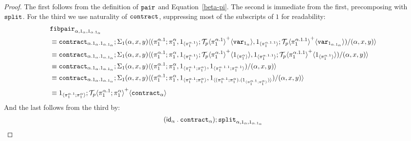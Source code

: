 \documentclass[10pt]{article}
\theoremstyle{definition}
\newcommand{\id}{\mathsf{id}}
\newcommand\ApEl[2]{\mathcal{T}_{#1}\langle#2\rangle}
\newcommand\bdot[0]{\mathbin{.}}
\newcommand\ap[2]{\ensuremath{#1 \langle #2 \rangle }}
\newcommand\ApPlus[2]{\ensuremath{{#1}^+ \langle #2 \rangle }}
\begin{document}
\begin{proof}
The first follows from the definition of $\mathtt{pair}_{}$ and Equation~\ref{beta-pi}. The second is immediate from the first, precomposing with $\mathtt{split}_{}$. For the third we use naturality of $\mathtt{contract}_{}$, suppressing most of the subscripts of $1$ for readability:
\begin{align*}
&\fibpair{\alpha,1_\alpha,1_{\alpha.1_\alpha}} \\
&\equiv \contract{\alpha.1_\alpha.1_{\alpha.1_\alpha}};\ap{\Sigma_1(\alpha,x,y)}{(\pi^{\alpha.1}_1;\pi^{\alpha}_1,\ApOne{\pi^{\alpha.1}_1};\ApPlus{\ApEl{p}{\pi^{\alpha.1}_1}}{\var{1_\alpha}}, \ApOne{\pi^{\alpha.1.1}_1};\ApPlus{\ApEl{p}{\pi^{\alpha.1.1}_1}}{\var{1_{\alpha.1_\alpha}}})/(\alpha,x,y)} \\
&\equiv \contract{\alpha.1_\alpha.1_{\alpha.1_\alpha}};\ap{\Sigma_1(\alpha,x,y)}{(\pi^{\alpha.1}_1;\pi^{\alpha}_1,\ApOne{\pi^{\alpha.1}_1};\ApPlus{\ApEl{p}{\pi^{\alpha.1}_1}}{\ApOne{\pi^\alpha_1}}, \ApOne{\pi^{\alpha.1.1}_1};\ApPlus{\ApEl{p}{\pi^{\alpha.1.1}_1}}{\ApOne{\pi^{\alpha.1}_1}})/(\alpha,x,y)} \\
&\equiv \contract{\alpha.1_\alpha.1_{\alpha.1_\alpha}};\ap{\Sigma_1(\alpha,x,y)}{(\pi^{\alpha.1}_1;\pi^{\alpha}_1,\ApOne{\pi^{\alpha.1}_1;\pi^\alpha_1}, \ApOne{\pi^{\alpha.1.1}_1;\pi^{\alpha.1}_1})/(\alpha,x,y)} \\
&\equiv \contract{\alpha.1_\alpha.1_{\alpha.1_\alpha}};\ap{\Sigma_1(\alpha,x,y)}{(\pi^{\alpha.1}_1;\pi^{\alpha}_1,\ApOne{\pi^{\alpha.1}_1;\pi^\alpha_1}, \ApOne{(\pi^{\alpha.1}_1;\pi^{\alpha}_1) \bdot (\ApOne{\pi^{\alpha.1}_1;\pi^{\alpha}_1})})/(\alpha,x,y)} \\
&\equiv \ApOne{\pi^{\alpha.1}_1;\pi^{\alpha}_1};\ApPlus{\ApEl{p}{\pi^{\alpha.1}_1;\pi^{\alpha}_1}}{\contract{\alpha}}
\end{align*}
And the last follows from the third by:
\begin{align*}
&(\id_\alpha \bdot \contract{\alpha});\tsplit{\alpha,1_\alpha,1_{\alpha.1_\alpha}} \\

\end{align*}
\end{proof}
\end{document}
